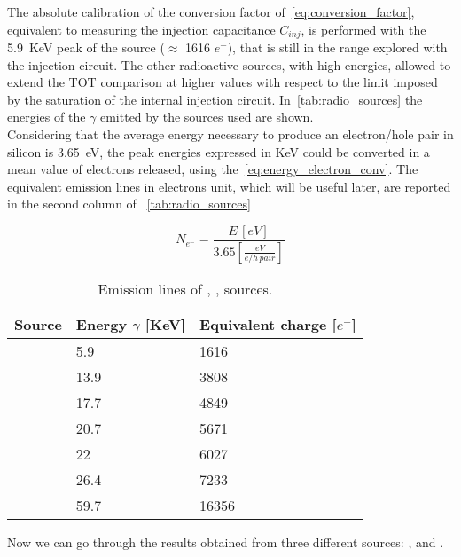 The absolute calibration of the conversion factor of~\autoref{eq:conversion_factor}, equivalent to measuring the injection capacitance $C_{inj}$,  is performed with the \SI{5.9}{KeV} peak of the  source ($\approx$ 1616 $e^{-}$), that is still in the range explored with the injection circuit. The other radioactive sources, with high energies, allowed to extend the TOT comparison at higher values with respect to the limit imposed by the saturation of the internal injection circuit. In~\autoref{tab:radio_sources} the energies of the $\gamma$ emitted by the sources used are shown.\\
Considering that the average energy necessary to produce an electron/hole pair in silicon is \SI{3.65}{eV}, the peak energies expressed in KeV could be converted in a mean value of electrons released, using the~\autoref{eq:energy_electron_conv}. The equivalent emission lines in electrons unit, which will be useful later, are reported in the second column of ~\autoref{tab:radio_sources}

\begin{equation}
N_{e^{-}} = \frac{E \, [eV]}{3.65 [\frac{eV}{e/h \, pair}]}
\label{eq:energy_electron_conv}
\end{equation}


\begin{table}[h!]
\centering
\begin{tabular}{C{3cm}|C{2.8cm}|C{2.8cm}}
\hline
Source & Energy $\gamma$ [KeV] & Equivalent charge [$e^{-}$]\\[2ex]
\hline
\hline
{} & 5.9 & 1616\\[0.5ex]
\hline
{} & 13.9 & 3808\\[0.5ex]
\hline
{} & 17.7 & 4849\\[0.5ex]
\hline
{} & 20.7 & 5671\\[0.5ex]
\hline
{} & 22 & 6027\\[0.5ex]
\hline
{} & 26.4 & 7233\\[0.5ex]
\hline
{} & 59.7 & 16356\\
\hline
\hline
\end{tabular}
\caption{Emission lines of , ,  sources.}
\label{tab:radio_sources}
\end{table}


Now we can go through the results obtained from three different sources: ,  and .

